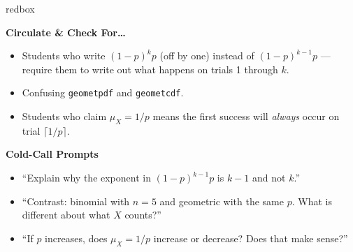 \documentclass[10pt]{article}
\begin{document}
\begin{skillbox}{redbox}
\begin{minipage}[t]{0.48\linewidth}
    \textbf{Circulate \& Check For\ldots}
    \begin{itemize}
        \item Students who write $(1-p)^k p$ (off by one) instead of
              $(1-p)^{k-1}p$ --- require them to write out what happens on
              trials 1 through $k$.
        \item Confusing \texttt{geometpdf} and \texttt{geometcdf}.
        \item Students who claim $\mu_X = 1/p$ means the first success will
              \emph{always} occur on trial $\lceil 1/p \rceil$.
    \end{itemize}
\end{minipage}
\hfill
\begin{minipage}[t]{0.48\linewidth}
    \textbf{Cold-Call Prompts}
    \begin{itemize}
        \item ``Explain why the exponent in $(1-p)^{k-1}p$ is $k-1$ and not $k$.''
        \item ``Contrast: binomial with $n = 5$ and geometric with the same $p$.
              What is different about what $X$ counts?''
        \item ``If $p$ increases, does $\mu_X = 1/p$ increase or decrease?
              Does that make sense?''
    \end{itemize}
\end{minipage}
\end{skillbox}
\end{document}
